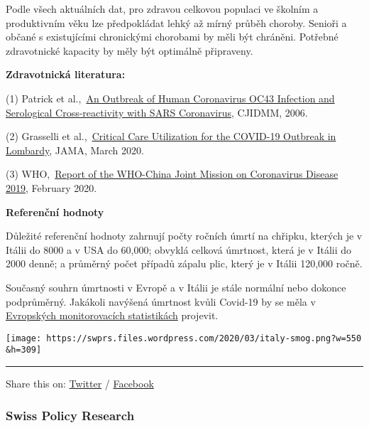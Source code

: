 Podle všech aktuálních dat, pro zdravou celkovou populaci ve školním a
produktivním věku lze předpokládat lehký až mírný průběh choroby.
Senioři a občané s existujícími chronickými chorobami by měli být
chráněni. Potřebné zdravotnické kapacity by měly být optimálně
připraveny.

\textbf{Zdravotnická literatura:}

(1) Patrick et
al.,~\href{https://www.ncbi.nlm.nih.gov/pmc/articles/PMC2095096/}{An
Outbreak of Human Coronavirus OC43 Infection and Serological
Cross-reactivity with SARS Coronavirus}, CJIDMM, 2006.

(2) Grasselli et
al.,~\href{https://jamanetwork.com/journals/jama/fullarticle/2763188}{Critical
Care Utilization for the COVID-19 Outbreak in Lombardy}, JAMA, March
2020.

(3)
WHO,~\href{https://www.who.int/docs/default-source/coronaviruse/who-china-joint-mission-on-covid-19-final-report.pdf}{Report
of the WHO-China Joint Mission on Coronavirus Disease 2019}, February
2020.

\textbf{Referenční hodnoty}

Důležité referenční hodnoty zahrnují počty ročních úmrtí na chřipku,
kterých je v Itálii do 8000 a v USA do 60,000; obvyklá celková úmrtnost,
která je v Itálii do 2000 denně; a průměrný počet případů zápalu plic,
který je v Itálii 120,000 ročně.

Současný souhrn úmrtnosti v Evropě a v Itálii je stále normální nebo
dokonce podprůměrný. Jakákoli navýšená úmrtnost kvůli Covid-19 by se
měla v \href{https://www.euromomo.eu/index.html}{Evropských
monitorovacích statistikách} projevit.

\texttt{[image: https://swprs.files.wordpress.com/2020/03/italy-smog.png?w=550\\\&h=309]}

\begin{center}\rule{0.5\linewidth}{\linethickness}\end{center}

Share this on:
\href{https://twitter.com/intent/tweet?url=https://swprs.org/fakta-o-covid-19/}{Twitter}
/
\href{https://www.facebook.com/share.php?u=https://swprs.org/fakta-o-covid-19/}{Facebook}\\

\hypertarget{swiss-policy-research}{%
\subsubsection{Swiss Policy Research}\label{swiss-policy-research}}

